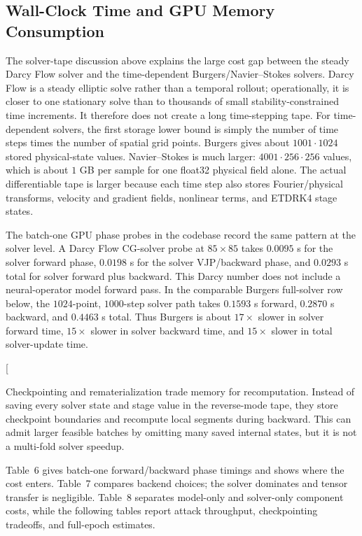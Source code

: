 \documentclass[letterpaper]{article} %
\begin{document}
\subsection*{Wall-Clock Time and GPU Memory Consumption}

The solver-tape discussion above explains the large cost gap between the steady
Darcy Flow solver and the time-dependent Burgers/Navier--Stokes solvers. Darcy
Flow is a steady elliptic solve rather than a temporal rollout; operationally,
it is closer to one stationary solve than to thousands of small
stability-constrained time increments. It therefore does not create a long
time-stepping tape. For time-dependent solvers, the first storage lower bound is
simply the number of time steps times the number of spatial grid points. Burgers
gives about $1001\cdot1024$ stored physical-state values. Navier--Stokes is much
larger: $4001\cdot256\cdot256$ values, which is about $1$ GB per sample for one
float32 physical field alone. The actual differentiable tape is larger because
each time step also stores Fourier/physical transforms, velocity and gradient
fields, nonlinear terms, and ETDRK4 stage states.

The batch-one GPU phase probes in the codebase record the same pattern at the
solver level. A Darcy Flow CG-solver probe at $85\times85$ takes $0.0095$ s for
the solver forward phase, $0.0198$ s for the solver VJP/backward phase, and
$0.0293$ s total for solver forward plus backward. This Darcy number does not
include a neural-operator model forward pass. In the comparable Burgers
full-solver row below, the $1024$-point, $1000$-step solver path takes $0.1593$ s
forward, $0.2870$ s backward, and $0.4463$ s total. Thus Burgers is about
$17\times$ slower in solver forward time, $15\times$ slower in solver backward
time, and $15\times$ slower in total solver-update time.

\clearpage
\twocolumn[
\noindent
\begin{minipage}{0.485\textwidth}
\setlength{\parindent}{1em}
Checkpointing and rematerialization trade memory for recomputation. Instead of
saving every solver state and stage value in the reverse-mode tape, they store
checkpoint boundaries and recompute local segments during backward. This can
admit larger feasible batches by omitting many saved internal states, but it is
not a multi-fold solver speedup.
\end{minipage}\hfill
\begin{minipage}{0.485\textwidth}
\setlength{\parindent}{1em}
Table~6 gives batch-one forward/backward phase timings and shows where the cost
enters. Table~7 compares backend choices; the solver dominates and tensor
transfer is negligible. Table~8 separates model-only and solver-only component
costs, while the following tables report attack throughput, checkpointing
tradeoffs, and full-epoch estimates.
\end{minipage}
\vspace{0.25em}
\end{document}

